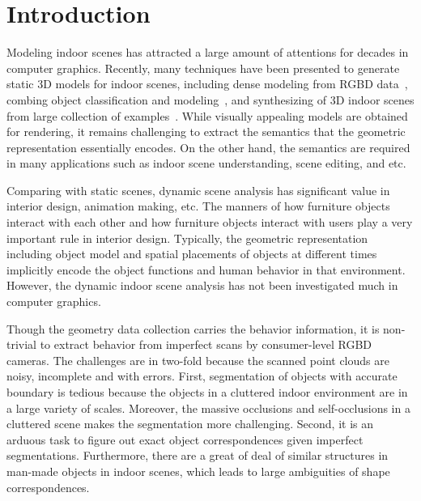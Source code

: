 
\section{Introduction}
\label{sec:intro}

Modeling indoor scenes has attracted a large amount of attentions for decades in computer graphics.
%
Recently, many techniques have been presented to generate static 3D models for indoor scenes, including dense modeling from RGBD data~\cite{Hen12RGB,kinectfusion11,MuseumCSG12,YanSiggraph14}, combing object classification and modeling~\cite{shao12,NanIndoor2012,kmyg_acquireIndoor_sigga12}, and synthesizing of 3D indoor scenes from large collection of examples~\cite{Fisherscenesynth12,Xu13sig}.
%
While visually appealing models are obtained for rendering, it remains challenging to extract the semantics that the geometric representation essentially encodes. 
%
On the other hand, the semantics are required in many applications such as indoor scene understanding, scene editing, and etc.


Comparing with static scenes, dynamic scene analysis has significant value in interior design, animation making, etc.
%
The manners of how furniture objects interact with each other and how furniture objects interact with users play a very important rule in interior design.
%
Typically, the geometric representation including object model and spatial placements of objects at different times implicitly encode the object functions and human behavior in that environment.
%
However, the dynamic indoor scene analysis has not been investigated much in computer graphics. 


Though the geometry data collection carries the behavior information, it is non-trivial to extract behavior from imperfect scans by consumer-level RGBD cameras.
%
The challenges are in two-fold because the scanned point clouds are noisy, incomplete and with errors. 
%
First, segmentation of objects with accurate boundary is tedious because the objects in a cluttered indoor environment are in a large variety of scales. Moreover, the massive occlusions and self-occlusions in a cluttered scene makes the segmentation more challenging.
%
Second, it is an arduous task to figure out exact object correspondences given imperfect segmentations. Furthermore, there are a great of deal of similar structures in man-made objects in indoor scenes, which leads to large ambiguities of shape correspondences. 
%


